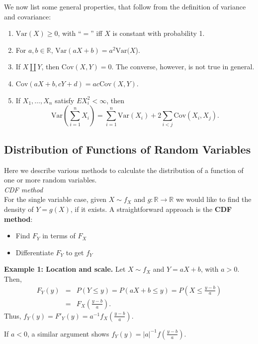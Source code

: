 \documentclass[12pt,oneside]{article}
\begin{document}
\noindent We now list some general properties, that follow from the definition of variance and covariance:
\begin{enumerate}
\item $\mbox{Var}(X) \geq 0$, with ``$=$'' iff $X$ is constant with probability 1.
\item For $a,b \in \mathbb{R}$, $\mbox{Var}(aX+b) = a^2 \mbox{Var}(X$).
\item If $X \coprod Y$, then $\mbox{Cov}(X,Y) = 0$.  The converse, however, is not true in general.
\item $\mbox{Cov}(aX +b,cY+d) = ac \mbox{Cov}(X,Y)$.
\item If $X_1,\hdots,X_n$ satisfy $EX_i^2 < \infty$, then
\[\mbox{Var}(\displaystyle\sum\limits_{i=1}^n X_i) = \displaystyle\sum\limits_{i=1}^n \mbox{Var}(X_i) + 2 \displaystyle\sum\limits_{i<j} \mbox{Cov}(X_i,X_j).\]
\end{enumerate}

\subsection{Distribution of Functions of Random Variables}

Here we describe various methods to calculate the distribution of a function of one or more random variables. \\

\noindent \emph{CDF method}\\

 For the single variable case, given $X \sim f_X$ and $g: \mathbb{R} \rightarrow \mathbb{R}$ we would like to find the density of $Y=g(X)$, if it exists.  A straightforward approach is the \textbf{CDF method}:
\begin{itemize}
\item Find $F_Y$ in terms of $F_X$
\item Differentiate $F_Y$ to get $f_Y$
\end{itemize}

\noindent \textbf{Example 1: Location and scale.}  Let $X \sim f_X$ and $Y = aX+b$, with $a>0$.  Then,
\begin{eqnarray*} F_Y(y) &=& P(Y \leq y) = P(aX+b \leq y)  = P(X \leq \frac{y-b}{a}) \\ &=& F_X (\frac{y-b}{a}). \end{eqnarray*}
Thus, $f_Y (y) = F'_Y (y) = a^{-1} f_X(\frac{y-b}{a}).$

If $a<0$, a similar argument shows $f_Y(y) = |a|^{-1} f(\frac{y-b}{a})$.  \\
\end{document}
